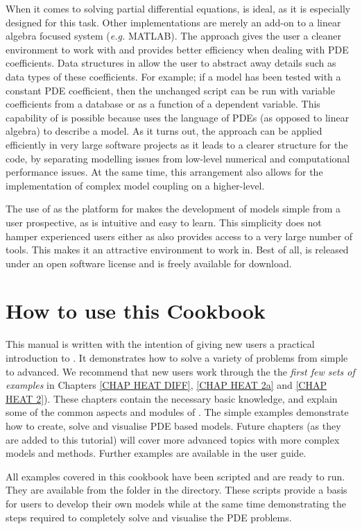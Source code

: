 When it comes to solving partial differential equations, \esc is ideal, as it is especially designed for this task. Other implementations are merely an add-on to a linear algebra focused system (\textit{e.g.} MATLAB). The \esc approach gives the user a cleaner environment to work with and provides better efficiency when dealing with PDE coefficients. Data structures in \esc allow the user to abstract away details such as data types of these coefficients. For example; if a model has been tested with a constant PDE coefficient, then the unchanged script can be run with variable coefficients from a database or as a function of a dependent variable. This capability of \esc is possible because \esc uses the language of PDEs (as opposed to linear algebra) to describe a model. As it turns out, the \esc approach can be applied efficiently in very large software projects as it leads to a clearer structure for the code, by separating modelling issues from low-level numerical and computational performance issues.  At the same time, this arrangement also allows for the implementation of complex model coupling on a higher-level. 

The use of \pyt as the platform for \esc makes the development of models  simple from a user prospective, as \pyt is intuitive and easy to learn. This simplicity does not hamper experienced users either as \pyt also provides access to a very large number of tools. This makes it an attractive environment to work in. Best of all, \esc is released under an open software license and is freely available for download.

\section{How to use this Cookbook}
This manual is written with the intention of giving new users a practical introduction to \esc. It demonstrates how to solve a variety of problems from simple to advanced. We recommend that new users work through the
the \textit{first few sets of examples} in Chapters \ref{CHAP HEAT DIFF}, \ref{CHAP HEAT 2a} and \ref{CHAP HEAT 2}).
These chapters contain the necessary basic knowledge, and explain some of the common aspects and modules of \esc. The simple examples demonstrate how to create, solve and visualise PDE based models. 
Future chapters (as they are added to this tutorial) will cover more advanced topics with more complex models and methods. Further examples are available in the \esc user guide.

All examples covered in this cookbook have been scripted and are ready to run. They are available from the \exf folder in the \esc directory. These scripts provide a basis for users to develop their own models while at the same time demonstrating the steps required to completely solve and visualise the PDE problems.




